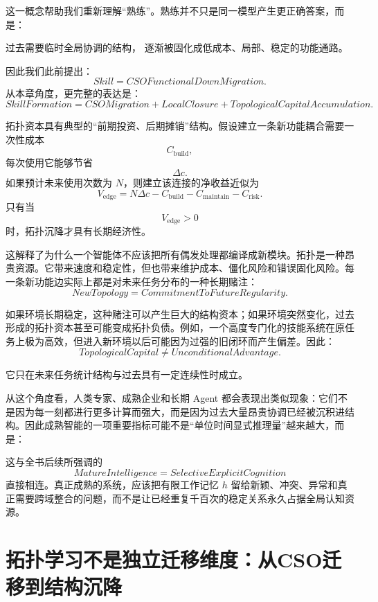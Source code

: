 这一概念帮助我们重新理解``熟练''。熟练并不只是同一模型产生更正确答案，而是：
\begin{statementbox}
过去需要临时全局协调的结构，
逐渐被固化成低成本、局部、稳定的功能通路。
\end{statementbox}
因此我们此前提出：
\[
\boxed{
Skill
=
CSOFunctionalDownMigration.
}
\]
从本章角度，更完整的表达是：
\[
\boxed{
SkillFormation
=
CSOMigration
+
LocalClosure
+
TopologicalCapitalAccumulation.
}
\]

拓扑资本具有典型的``前期投资、后期摊销''结构。假设建立一条新功能耦合需要一次性成本
\[
C_{\mathrm{build}},
\]
每次使用它能够节省
\[
\Delta c.
\]
如果预计未来使用次数为 $N$，则建立该连接的净收益近似为
\[
V_{\mathrm{edge}}
=
N\Delta c
-
C_{\mathrm{build}}
-
C_{\mathrm{maintain}}
-
C_{\mathrm{risk}}.
\]
只有当
\[
V_{\mathrm{edge}}>0
\]
时，拓扑沉降才具有长期经济性。

这解释了为什么一个智能体不应该把所有偶发处理都编译成新模块。拓扑是一种昂贵资源。它带来速度和稳定性，但也带来维护成本、僵化风险和错误固化风险。每一条新功能边实际上都是对未来任务分布的一种长期赌注：
\[
\boxed{
NewTopology
=
CommitmentToFutureRegularity.
}
\]

如果环境长期稳定，这种赌注可以产生巨大的结构资本；如果环境突然变化，过去形成的拓扑资本甚至可能变成拓扑负债。例如，一个高度专门化的技能系统在原任务上极为高效，但进入新环境以后可能因为过强的旧闭环而产生偏差。因此：
\[
\boxed{
TopologicalCapital
\neq
UnconditionalAdvantage.
}
\]

它只在未来任务统计结构与过去具有一定连续性时成立。

从这个角度看，人类专家、成熟企业和长期 Agent 都会表现出类似现象：它们不是因为每一刻都进行更多计算而强大，而是因为过去大量昂贵协调已经被沉积进结构。因此成熟智能的一项重要指标可能不是``单位时间显式推理量''越来越大，而是：
\begin{statementbox}
\centering
{}
\end{statementbox}

这与全书后续所强调的
\[
MatureIntelligence
=
SelectiveExplicitCognition
\]
直接相连。真正成熟的系统，应该把有限工作记忆 $h$ 留给新颖、冲突、异常和真正需要跨域整合的问题，而不是让已经重复千百次的稳定关系永久占据全局认知资源。


\section{拓扑学习不是独立迁移维度：从CSO迁移到结构沉降}


